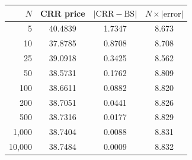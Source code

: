 \begin{tabular}{rccc}
\toprule
$N$ & CRR price & $|\mathrm{CRR}-\mathrm{BS}|$ & $N\times|\mathrm{error}|$ \\
\midrule
5 & 40.4839 & 1.7347 & 8.673 \\
10 & 37.8785 & 0.8708 & 8.708 \\
25 & 39.0918 & 0.3425 & 8.562 \\
50 & 38.5731 & 0.1762 & 8.809 \\
100 & 38.6611 & 0.0882 & 8.820 \\
200 & 38.7051 & 0.0441 & 8.826 \\
500 & 38.7316 & 0.0177 & 8.829 \\
1,000 & 38.7404 & 0.0088 & 8.831 \\
10,000 & 38.7484 & 0.0009 & 8.832 \\
\bottomrule
\end{tabular}
